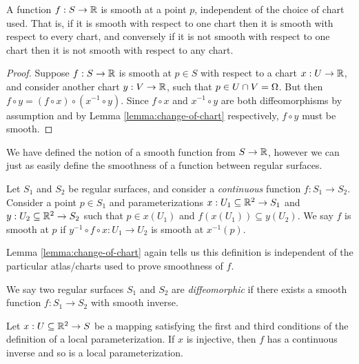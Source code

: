 \begin{lemma}
    A function $f: S \to \mathbb{R}$ is smooth at a point $p$, independent of the choice of chart used. That is, if it is smooth with respect to one chart then it is smooth with respect to every chart, and conversely if it is not smooth with respect to one chart then it is not smooth with respect to any chart.
\end{lemma}

\begin{proof}
    Suppose $f: S \to \mathbb{R}$ is smooth at $p \in S$ with respect to a chart $x: U \to \mathbb{R}$, and consider another chart $y: V \to \mathbb{R}$, such that $p \in U \cap V = \Omega$. But then $f \circ y = (f \circ x) \circ (x^{-1} \circ y)$. Since $f \circ x$ and $x^{-1} \circ y$ are both diffeomorphisms by assumption and by Lemma \ref{lemma:change-of-chart} respectively, $f \circ y$ must be smooth.
\end{proof}

\begin{rmk}
    We have defined the notion of a smooth function from $S \to \mathbb{R}$, however we can just as easily define the smoothness of a function between regular surfaces.
\end{rmk}

\begin{defn}
    Let $S_1$ and $S_2$ be regular surfaces, and consider a \emph{continuous} function $f: S_1 \to S_2$. Consider a point $p \in S_1$ and parameterizations $x: U_1 \subseteq \mathbb{R}^2 \to S_1$ and $y: U_2 \subseteq \mathbb{R}^2 \to S_2$ such that $p \in x(U_1)$ and $f(x(U_1)) \subseteq y(U_2)$. We say $f$ is smooth at $p$ if $y^{-1} \circ f \circ x: U_1 \to U_2$ is smooth at $x^{-1}(p)$.
\end{defn}

\begin{prop}
    Lemma \ref{lemma:change-of-chart} again tells us this definition is independent of the particular atlas/charts used to prove smoothness of $f$.
\end{prop}

\begin{defn}
    We say two regular surfaces $S_1$ and $S_2$ are \emph{diffeomorphic} if there exists a smooth function $f: S_1 \to S_2$ with smooth inverse.
\end{defn}

\begin{prop}
    Let $x: U \subseteq \mathbb{R}^2 \to S$ be a mapping satisfying the first and third conditions of the definition of a local parameterization. If $x$ is injective, then $f$ has a continuous inverse and so is a local parameterization.
\end{prop}

